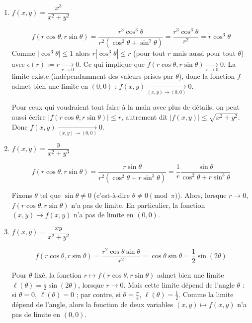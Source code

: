 \documentclass[11pt, class=report,crop=false]{standalone}
\begin{document}
\begin{exemple}
\sauteligne
\begin{enumerate}
  \item $f(x,y)=\dfrac{x^3}{x^2+y^2}$
  
  $$f(r\cos\theta,r\sin\theta) = \frac{r^3 \cos^3\theta}{r^2 (\cos^2\theta+\sin^2\theta)}
  = \frac{r^3 \cos^3\theta}{r^2} = r \cos^3 \theta$$
  Comme $\big| \cos^3 \theta \big| \le 1$ alors $r |\cos^3 \theta| \le r$ (pour tout $r$ mais aussi pour tout $\theta$) avec $\epsilon(r) := r \underset{r\to0}{\longrightarrow} 0$.  
  Ce qui implique que $f(r\cos\theta,r\sin\theta) \underset{r\to0}{\longrightarrow} 0$.
  La limite existe (indépendamment des valeurs prises par $\theta$), donc 
  la fonction $f$ admet bien une limite en $(0,0)$ : $f(x,y) \xrightarrow[(x,y) \to (0,0)]{} 0$.
  
  Pour ceux qui voudraient tout faire à la main avec plus de détails, on peut aussi écrire $\big|f(r\cos\theta,r\sin\theta)\big| \le r$, autrement dit $\big|f( x,y) \big| \le \sqrt{x^2+y^2}$. Donc $f(x,y) \xrightarrow[(x,y) \to (0,0)]{} 0$.
  
   
  \item $f(x,y)=\dfrac{y}{x^2+y^3}$
  
  
 $$f(r\cos\theta,r\sin\theta) = \frac{r\sin\theta}{r^2(\cos^2\theta + r\sin^3\theta)} = \frac{1}{r} \frac{\sin\theta}{\cos^2\theta + r\sin^3\theta}$$
 
Fixons $\theta$ tel que $\sin \theta \neq 0$ (c'est-à-dire $\theta \neq 0 \pmod \pi$). Alors, lorsque $r\to0$, $f(r\cos\theta,r\sin\theta)$ n'a pas de limite. En particulier, la fonction $(x,y) \mapsto f(x,y)$ n'a pas de limite en $(0,0)$.
 
  
  \item  $f(x,y)=\dfrac{xy}{x^2+y^2}$
  
 $$f(r\cos\theta,r\sin\theta) = \frac{r^2 \cos\theta\sin\theta}{r^2}
  = \cos\theta \sin \theta = \frac12\sin(2\theta)$$ 

Pour $\theta$ fixé, la fonction $r \mapsto f(r\cos\theta,r\sin\theta)$ admet bien une limite $\ell(\theta) = \frac12\sin(2\theta)$, lorsque $r\to0$. Mais cette limite dépend de l'angle $\theta$ :
si $\theta =0$, $\ell(\theta)=0$ ; par contre, si $\theta = \frac\pi4$, $\ell(\theta) = \frac12$. Comme la limite dépend de l'angle, alors la fonction de deux variables $(x,y) \mapsto f(x,y)$ n'a pas de limite en $(0,0)$.
\end{enumerate}
\end{exemple}
\end{document}
